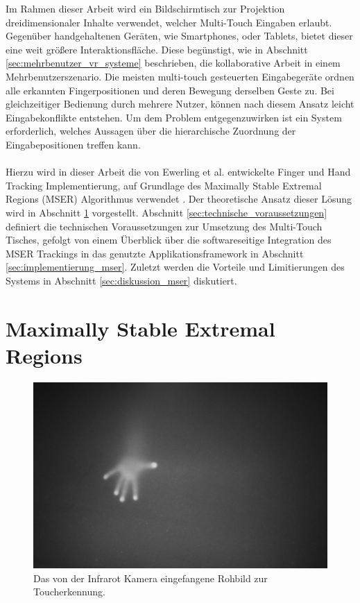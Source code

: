Im Rahmen dieser Arbeit wird ein Bildschirmtisch zur Projektion dreidimensionaler Inhalte verwendet, welcher Multi-Touch Eingaben erlaubt. Gegenüber handgehaltenen Geräten, wie Smartphones, oder Tablets, bietet dieser eine weit größere Interaktionsfläche. Diese begünstigt, wie in Abschnitt \ref{sec:mehrbenutzer_vr_systeme} beschrieben, die kollaborative Arbeit in einem Mehrbenutzerszenario. Die meisten multi-touch gesteuerten Eingabegeräte ordnen alle erkannten Fingerpositionen und deren Bewegung derselben Geste zu. Bei gleichzeitiger Bedienung durch mehrere Nutzer, können nach diesem Ansatz leicht Eingabekonflikte entstehen. Um dem Problem entgegenzuwirken ist ein System erforderlich, welches Aussagen über die hierarchische Zuordnung der Eingabepositionen treffen kann.
\\\\
Hierzu wird in dieser Arbeit die von Ewerling et al. entwickelte Finger und Hand Tracking Implementierung, auf Grundlage des Maximally Stable Extremal Regions (MSER) Algorithmus verwendet \cite{matas:2004, ewerling:2012}. Der theoretische Ansatz dieser Lösung wird in Abschnitt \ref{sec:maximally_stable_extremal_regions} vorgestellt. Abschnitt \ref{sec:technische_voraussetzungen} definiert die technischen Voraussetzungen zur Umsetzung des Multi-Touch Tisches, gefolgt von einem Überblick über die softwareseitige Integration des  MSER Trackings in das genutzte Applikationsframework in Abschnitt \ref{sec:implementierung_mser}. Zuletzt werden die Vorteile und Limitierungen des Systems in Abschnitt \ref{sec:diskussion_mser} diskutiert.


\section{Maximally Stable Extremal Regions}
\label{sec:maximally_stable_extremal_regions}

\begin{figure}
	\begin{center}
		\includegraphics[width=12cm]{img/mser_1.pdf}
	\end{center}
	\caption{Das von der Infrarot Kamera eingefangene Rohbild zur Toucherkennung.}
	\label{fig:mser_1}
\end{figure}

